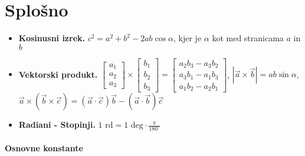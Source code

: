 \section*{Splošno}
\begin{itemize}
    \item \textbf{Kosinusni izrek.} \(c^2 = a^2 + b^2 - 2ab \cos \alpha\), kjer je \(\alpha\) kot med stranicama \(a\) in \(b\)
    \item \textbf{Vektorski produkt.} \(\begin{bmatrix}
        a_1 \\ a_2 \\ a_ 3
    \end{bmatrix} \times \begin{bmatrix}
        b_1 \\ b_2 \\ b_3
    \end{bmatrix} = \begin{bmatrix}
        a_2b_3 - a_3b_2 \\ a_3b_1 - a_1b_3 \\ a_1b_2 - a_2b_1
    \end{bmatrix} \), \(|\vec{a} \times \vec{b}| = ab \sin \alpha \), \(\vec{a} \times (\vec{b} \times \vec{c}) = (\vec{a} \cdot \vec{c}) \vec{b} - (\vec{a} \cdot \vec{b}) \vec{c}\)
    \item \textbf{Radiani - Stopinji.} \(1 \text{ rd} = 1 \text{ deg} \cdot \frac{\pi}{180^\circ}\)
\end{itemize}

\paragraph{Osnovne konstante} \ 

